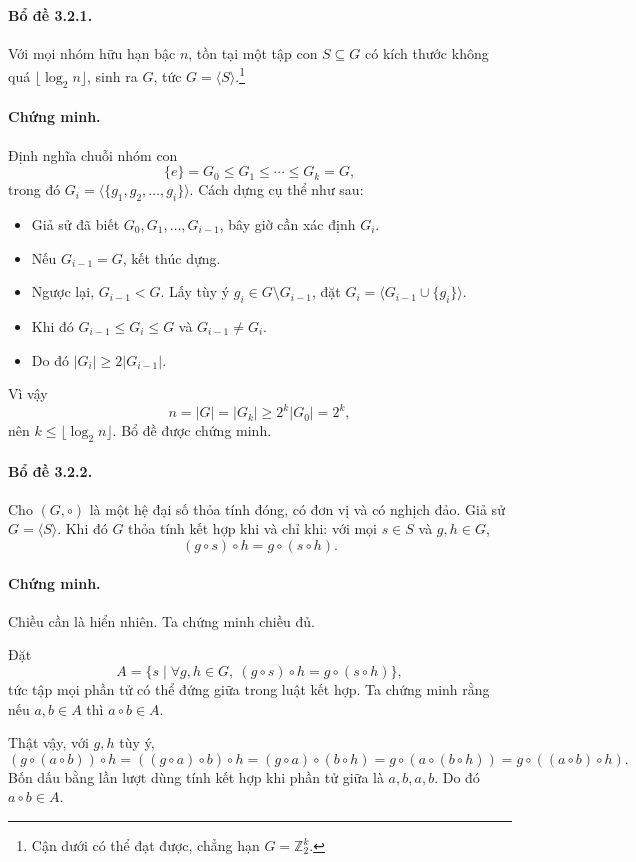 \documentclass[11pt]{article}
\begin{document}
\paragraph{Bổ đề 3.2.1.}
Với mọi nhóm hữu hạn bậc \(n\), tồn tại một tập con \(S\subseteq G\) có kích
thước không quá \(\lfloor\log_2 n\rfloor\), sinh ra \(G\), tức
\(G=\langle S\rangle\).\footnote{Cận dưới có thể đạt được, chẳng hạn
\(G=\mathbb{Z}_2^k\).}

\paragraph{Chứng minh.}
Định nghĩa chuỗi nhóm con
\[
  \{e\}=G_0\le G_1\le\cdots\le G_k=G,
\]
trong đó \(G_i=\langle\{g_1,g_2,\ldots,g_i\}\rangle\). Cách dựng cụ thể như
sau:
\begin{itemize}
  \item Giả sử đã biết \(G_0,G_1,\ldots,G_{i-1}\), bây giờ cần xác định
  \(G_i\).
  \item Nếu \(G_{i-1}=G\), kết thúc dựng.
  \item Ngược lại, \(G_{i-1}<G\). Lấy tùy ý \(g_i\in G\setminus G_{i-1}\), đặt
  \(G_i=\langle G_{i-1}\cup\{g_i\}\rangle\).
  \item Khi đó \(G_{i-1}\le G_i\le G\) và \(G_{i-1}\ne G_i\).
  \item Do đó \(|G_i|\ge 2|G_{i-1}|\).
\end{itemize}
Vì vậy
\[
  n=|G|=|G_k|\ge 2^k|G_0|=2^k,
\]
nên \(k\le\lfloor\log_2 n\rfloor\). Bổ đề được chứng minh.

\paragraph{Bổ đề 3.2.2.}
Cho \((G,\circ)\) là một hệ đại số thỏa tính đóng, có đơn vị và có nghịch đảo.
Giả sử \(G=\langle S\rangle\). Khi đó \(G\) thỏa tính kết hợp khi và chỉ khi:
với mọi \(s\in S\) và \(g,h\in G\),
\[
  (g\circ s)\circ h=g\circ(s\circ h).
\]

\paragraph{Chứng minh.}
Chiều cần là hiển nhiên. Ta chứng minh chiều đủ.

Đặt
\[
  A=\{s\mid \forall g,h\in G,\ (g\circ s)\circ h=g\circ(s\circ h)\},
\]
tức tập mọi phần tử có thể đứng giữa trong luật kết hợp. Ta chứng minh rằng
nếu \(a,b\in A\) thì \(a\circ b\in A\).

Thật vậy, với \(g,h\) tùy ý,
\[
  (g\circ(a\circ b))\circ h
  =((g\circ a)\circ b)\circ h
  =(g\circ a)\circ(b\circ h)
  =g\circ(a\circ(b\circ h))
  =g\circ((a\circ b)\circ h).
\]
Bốn dấu bằng lần lượt dùng tính kết hợp khi phần tử giữa là \(a,b,a,b\). Do đó
\(a\circ b\in A\).
\end{document}
